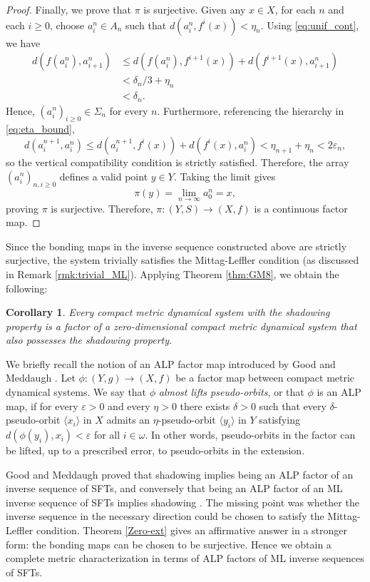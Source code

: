 \documentclass[10pt,a4paper]{amsart}
\newtheorem{corollary}[theorem]{Corollary}
\numberwithin{equation}{section}
\begin{document}
\begin{proof}
Finally, we prove that $\pi$ is surjective. Given any $x \in X$, for each $n$ and each $i \geq 0$, choose $a_i^n \in A_n$ such that $d(a_i^n, f^i(x)) < \eta_n$. Using \eqref{eq:unif_cont}, we have
\[
\begin{aligned}
        d(f(a_i^n), a_{i+1}^n)
        &\leq
        d(f(a_i^n), f^{i+1}(x)) + d(f^{i+1}(x), a_{i+1}^n) \\
        &<
        \delta_n/3 + \eta_n \\
        &<
        \delta_n.
\end{aligned}
\]
Hence, $(a_i^n)_{i\geq 0} \in \Sigma_n$ for every $n$. Furthermore, referencing the hierarchy in \eqref{eq:eta_bound},
\[
        d(a_i^{n+1}, a_i^n)
        \leq
        d(a_i^{n+1}, f^i(x)) + d(f^i(x), a_i^n)
        <
        \eta_{n+1} + \eta_n
        <
        2\varepsilon_n,
\]
so the vertical compatibility condition is strictly satisfied. Therefore, the array $(a_i^n)_{n,i\geq 0}$ defines a valid point $y \in Y$. Taking the limit gives
\[
        \pi(y) = \lim_{n\to\infty} a_0^n = x,
\]
proving $\pi$ is surjective. Therefore, $\pi:(Y,S)\to(X,f)$ is a continuous factor map.
\end{proof}
 
Since the bonding maps in the inverse sequence constructed above are strictly surjective, the system trivially satisfies the Mittag-Leffler condition (as discussed in Remark \ref{rmk:trivial_ML}). Applying Theorem \ref{thm:GM8}, we obtain the following:

\begin{corollary}
Every compact metric dynamical system with the shadowing property is a factor of a zero-dimensional compact metric dynamical system that also possesses the shadowing property.
\end{corollary}

We briefly recall the notion of an ALP factor map introduced by Good and
Meddaugh \cite{GM}. Let $\phi:(Y,g)\to (X,f)$ be a factor map between compact
metric dynamical systems. We say that $\phi$ \emph{almost lifts pseudo-orbits}, or that
$\phi$ is an ALP map, if for every $\varepsilon>0$ and every $\eta>0$ there exists
$\delta>0$ such that every $\delta$-pseudo-orbit $\langle x_i\rangle$ in $X$ admits
an $\eta$-pseudo-orbit $\langle y_i\rangle$ in $Y$ satisfying
$d(\phi(y_i),x_i)<\varepsilon$ for all $i\in\omega$. In other words, pseudo-orbits
in the factor can be lifted, up to a prescribed error, to pseudo-orbits in the
extension.


Good and Meddaugh proved that shadowing implies being an ALP factor of an
inverse sequence of SFTs, and conversely that being an ALP factor of an ML inverse
sequence of SFTs implies shadowing \cite[Corollary 28]{GM}. The missing point was whether the inverse
sequence in the necessary direction could be chosen to satisfy the Mittag-Leffler
condition. Theorem \ref{Zero-ext} gives an affirmative answer in a
stronger form: the bonding maps can be chosen to be surjective. Hence we obtain a
complete metric characterization in terms of ALP factors of ML inverse sequences
of SFTs.
\end{document}
